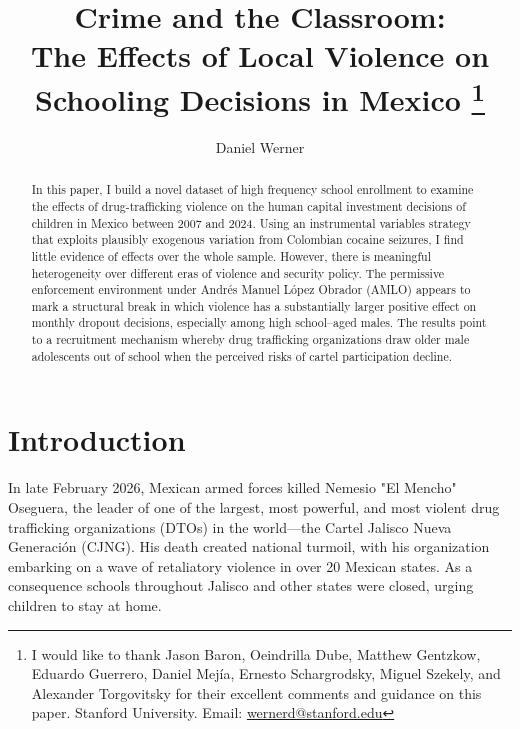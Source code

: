 \documentclass[12pt,letter,english,intoc,bibliography=totoc,index=totoc,BCOR10mm,captions=tableheading,nottitlepage,fleqn]{article}
\theoremstyle{break}
\begin{document}
\lhead[]{}
\rhead[]{}
\lfoot[\thepage]{}
\cfoot{}
\rfoot[]{\thepage}

\newpage

\begin{titlepage}
\title{Crime and the Classroom:\\
The Effects of Local Violence on Schooling Decisions in Mexico%
\thanks{
I would like to thank Jason Baron, Oeindrilla Dube, Matthew Gentzkow, Eduardo Guerrero, Daniel Mej\'{i}a, Ernesto Schargrodsky, Miguel Szekely, and Alexander Torgovitsky for their excellent comments and guidance on this paper. Stanford University. Email: \href{mailto:wernerd@stanford.edu}{wernerd@stanford.edu}
}}
\author{%
  Daniel Werner%
}

\maketitle
\begin{abstract}
In this paper, I build a novel dataset of high frequency school enrollment to examine the effects of drug-trafficking violence on the human capital investment decisions of children in Mexico between 2007 and 2024. Using an instrumental variables strategy that exploits plausibly exogenous variation from Colombian cocaine seizures, I find little evidence of effects over the whole sample. However, there is meaningful heterogeneity over different eras of violence and security policy. The permissive enforcement environment under Andr\'{e}s Manuel L\'{o}pez Obrador (AMLO) appears to mark a structural break in which violence has a substantially larger positive effect on monthly dropout decisions, especially among high school--aged males.  The results point to a recruitment mechanism whereby drug trafficking organizations draw older male adolescents out of school when the perceived risks of cartel participation decline.  
\end{abstract}

\setcounter{page}{0}
\thispagestyle{empty}
\end{titlepage}

\pagebreak \newpage

\section{Introduction}
In late February 2026, Mexican armed forces killed Nemesio "El Mencho" Oseguera, the leader of one of the largest, most powerful, and most violent drug trafficking organizations (DTOs) in the world---the Cartel Jalisco Nueva Generaci\'{o}n (CJNG). His death created national turmoil, with his organization embarking on a wave of retaliatory violence in over 20 Mexican states. As a consequence schools throughout Jalisco and other states were closed, urging children to stay at home. 
\end{document}
